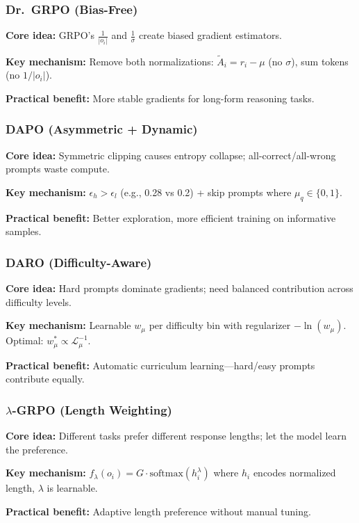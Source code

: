 \documentclass[11pt,a4paper]{article}
\begin{document}
\subsubsection{Dr.~GRPO (Bias-Free)}
\begin{keyinsightbox}
\textbf{Core idea:} GRPO's $\frac{1}{|o_i|}$ and $\frac{1}{\sigma}$ create biased gradient estimators.

\textbf{Key mechanism:} Remove both normalizations: $\tilde{A}_i = r_i - \mu$ (no $\sigma$), sum tokens (no $1/|o_i|$).

\textbf{Practical benefit:} More stable gradients for long-form reasoning tasks.
\end{keyinsightbox}

\subsubsection{DAPO (Asymmetric + Dynamic)}
\begin{keyinsightbox}
\textbf{Core idea:} Symmetric clipping causes entropy collapse; all-correct/all-wrong prompts waste compute.

\textbf{Key mechanism:} $\epsilon_h > \epsilon_l$ (e.g., 0.28 vs 0.2) + skip prompts where $\mu_q \in \{0, 1\}$.

\textbf{Practical benefit:} Better exploration, more efficient training on informative samples.
\end{keyinsightbox}

\subsubsection{DARO (Difficulty-Aware)}
\begin{keyinsightbox}
\textbf{Core idea:} Hard prompts dominate gradients; need balanced contribution across difficulty levels.

\textbf{Key mechanism:} Learnable $w_\mu$ per difficulty bin with regularizer $-\ln(w_\mu)$. Optimal: $w_\mu^* \propto \mathcal{L}_\mu^{-1}$.

\textbf{Practical benefit:} Automatic curriculum learning—hard/easy prompts contribute equally.
\end{keyinsightbox}

\subsubsection{$\lambda$-GRPO (Length Weighting)}
\begin{keyinsightbox}
\textbf{Core idea:} Different tasks prefer different response lengths; let the model learn the preference.

\textbf{Key mechanism:} $f_\lambda(o_i) = G \cdot \text{softmax}(h_i^\lambda)$ where $h_i$ encodes normalized length, $\lambda$ is learnable.

\textbf{Practical benefit:} Adaptive length preference without manual tuning.
\end{keyinsightbox}
\end{document}

